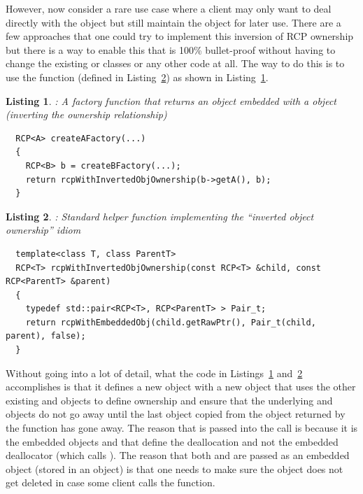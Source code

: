 \documentclass[pdf,ps2pdf,11pt]{SANDreport}
\newtheorem{listing}{Listing}
\begin{document}
However, now consider a rare use case where a client may only want to
deal directly with the {} object but still maintain the
{} object for later use.  There are a few approaches that
one could try to implement this inversion of RCP ownership but there
is a way to enable this that is 100\% bullet-proof without having to
change the existing {} or {} classes or any other
code at all.  The way to do this is to use the
{} function (defined in
Listing~\ref{listing:rcpWithInvertedObjOwnership}) as shown in
Listing~\ref{listing:A_owns_B_owns_A}.

\begin{listing}: A factory function that returns an {} object
embedded with a {} object (inverting the ownership relationship) \\
\label{listing:A_owns_B_owns_A}
{\small\begin{verbatim}
  RCP<A> createAFactory(...)
  {
    RCP<B> b = createBFactory(...);
    return rcpWithInvertedObjOwnership(b->getA(), b);
  }
\end{verbatim}}
\end{listing}


\begin{listing}: Standard helper function implementing the ``inverted
object ownership'' idiom \\
\label{listing:rcpWithInvertedObjOwnership}
{\small\begin{verbatim}
  template<class T, class ParentT>
  RCP<T> rcpWithInvertedObjOwnership(const RCP<T> &child, const RCP<ParentT> &parent)
  {
    typedef std::pair<RCP<T>, RCP<ParentT> > Pair_t;
    return rcpWithEmbeddedObj(child.getRawPtr(), Pair_t(child, parent), false);
  }
\end{verbatim}}
\end{listing}




Without going into a lot of detail, what the code in
Listings~\ref{listing:A_owns_B_owns_A}
and~\ref{listing:rcpWithInvertedObjOwnership} accomplishes is that it
defines a new {} object with a new {} object
that uses the other existing {} and {} objects
to define ownership and ensure that the underlying {} and
{} objects do not go away until the last {} object
copied from the object returned by the function
{} has gone away.  The reason that
{} is passed into the {} call
is because it is the embedded objects {} and
{} that define the deallocation and not the embedded
deallocator (which calls {}).  The reason that both
{} and {} are passed as an embedded object
(stored in an {} object) is that one needs to make sure
the {} object does not get deleted in case some client calls
the {} function.
\end{document}
